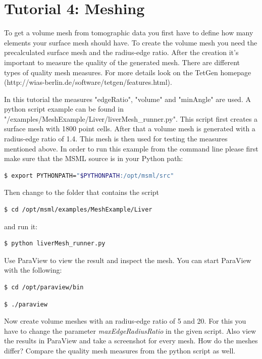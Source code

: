 \chapter{Tutorial 4: Meshing}

To get a volume mesh from tomographic data you first have to define how many elements your surface mesh should have.
To create the volume mesh you need the precalculated surface mesh and the radius-edge ratio.
After the creation it's important to measure the quality of the generated mesh. 
There are different types of quality mesh measures. 
For more details look on the TetGen homepage (http://wias-berlin.de/software/tetgen/features.html).

In this tutorial the measures "edgeRatio", "volume" and "minAngle" are used.
A python script example can be found in "/examples/MeshExample/Liver/liverMesh\_runner.py". 
This script first creates a surface mesh with 1800 point cells. 
After that a volume mesh is generated with a radius-edge ratio of 1.4.
This mesh is then used for testing the measures mentioned above.
In order to run this example from the command line please first make sure that the MSML source is in your Python path:
\begin{lstlisting}[language=sh, breaklines=true]
$ export PYTHONPATH="$PYTHONPATH:/opt/msml/src"
\end{lstlisting}

Then change to the folder that contains the script

\begin{lstlisting}[language=sh, breaklines=true]
$ cd /opt/msml/examples/MeshExample/Liver
\end{lstlisting}

and run it:

\begin{lstlisting}[language=sh, breaklines=true]
$ python liverMesh_runner.py
\end{lstlisting}

Use ParaView to view the result and inspect the mesh. 
You can start ParaView with the following:
\begin{lstlisting}[language=sh, breaklines=true]
$ cd /opt/paraview/bin
\end{lstlisting}
\begin{lstlisting}[language=sh, breaklines=true]
$ ./paraview
\end{lstlisting}

Now create volume meshes with an radius-edge ratio of 5 and 20.
For this you have to change the parameter \emph{maxEdgeRadiusRatio} in the given script.
Also view the results in ParaView and take a screenshot for every mesh.
How do the meshes differ? 
Compare the quality mesh measures from the python script as well.

